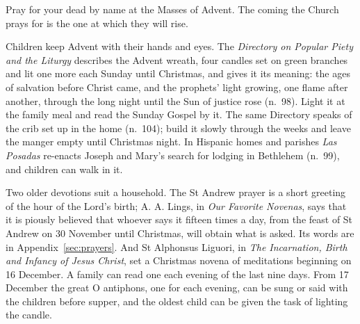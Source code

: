 \noindent Pray for your dead by name at the Masses of Advent. The coming the
Church prays for is the one at which they will rise.

Children keep Advent with their hands and eyes. The \emph{Directory on Popular
Piety and the Liturgy} describes the Advent wreath, four candles set on green
branches and lit one more each Sunday until Christmas, and gives it its meaning:
the ages of salvation before Christ came, and the prophets' light growing, one
flame after another, through the long night until the Sun of justice rose
(n.~98). Light it at the family meal and read the Sunday Gospel by it. The same
Directory speaks of the crib set up in the home (n.~104); build it slowly through
the weeks and leave the manger empty until Christmas night. In Hispanic homes and
parishes \emph{Las Posadas} re-enacts Joseph and Mary's search for lodging in
Bethlehem (n.~99), and children can walk in it.

Two older devotions suit a household. The St Andrew prayer is a short greeting of
the hour of the Lord's birth; A. A. Lings, in \emph{Our Favorite Novenas},
says that it is piously believed that whoever says it fifteen times a day, from the feast of St
Andrew on 30 November until Christmas, will obtain what is asked. Its words are
in Appendix~\ref{sec:prayers}.
And St Alphonsus Liguori, in \emph{The Incarnation, Birth and Infancy of Jesus
Christ}, set a Christmas novena of meditations beginning on 16 December. A family can read one each evening of the last nine days. From 17
December the great O antiphons, one for each evening, can be sung or said with
the children before supper, and the oldest child can be given the task of
lighting the candle.

